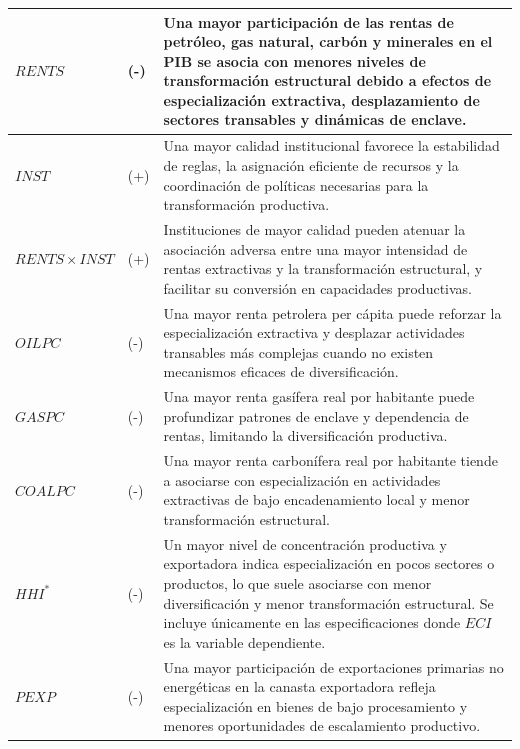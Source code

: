 \documentclass[../../TFM.tex]{subfiles}
\begin{document}
\begin{longtable}{|
			>{\raggedright\arraybackslash}p{}|
			>{\centering\arraybackslash}p{}|
			>{\raggedright\arraybackslash}p{}|}
		\endlastfoot

		$RENTS$
		& (-)
		& Una mayor participación de las rentas de petróleo, gas natural, carbón y minerales en el PIB se asocia con menores niveles de transformación estructural debido a efectos de especialización extractiva, desplazamiento de sectores transables y dinámicas de enclave. \\
		\hline

		$INST$
		& (+)
		& Una mayor calidad institucional favorece la estabilidad de reglas, la asignación eficiente de recursos y la coordinación de políticas necesarias para la transformación productiva. \\
		\hline

		$RENTS\times INST$
		& (+)
		& Instituciones de mayor calidad pueden atenuar la asociación adversa entre una mayor intensidad de rentas extractivas y la transformación estructural, y facilitar su conversión en capacidades productivas. \\
		\hline

		$OILPC$
		& (-)
		& Una mayor renta petrolera per cápita puede reforzar la especialización extractiva y desplazar actividades transables más complejas cuando no existen mecanismos eficaces de diversificación.
		\\
		\hline

		$GASPC$
		& (-)
		& Una mayor renta gasífera real por habitante puede profundizar patrones de enclave y dependencia de rentas, limitando la diversificación productiva.
		\\
		\hline

		$COALPC$
		& (-)
		& Una mayor renta carbonífera real por habitante tiende a asociarse con especialización en actividades extractivas de bajo encadenamiento local y menor transformación estructural.
		\\
		\hline

		$HHI^{*}$
		& (-)
		& Un mayor nivel de concentración productiva y exportadora indica especialización en pocos sectores o productos, lo que suele asociarse con menor diversificación y menor transformación estructural. Se incluye únicamente en las especificaciones donde $ECI$ es la variable dependiente. \\
		\hline

		$PEXP$
		& (-)
		& Una mayor participación de exportaciones primarias no energéticas en la canasta exportadora refleja especialización en bienes de bajo procesamiento y menores oportunidades de escalamiento productivo.
		\\
		\hline


\end{longtable}
\end{document}
